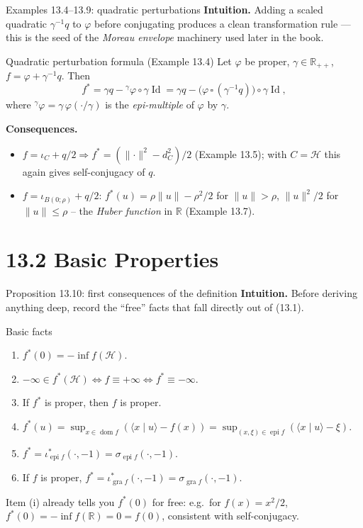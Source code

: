 \documentclass[aspectratio=169,10pt]{beamer}
\newcommand{\R}{\mathbb{R}}
\newcommand{\Hil}{\mathcal{H}}
\newcommand{\inner}[2]{\langle #1 \mid #2 \rangle}
\newcommand{\norm}[1]{\lVert #1 \rVert}
\newcommand{\dom}{\operatorname{dom}}
\newcommand{\epi}{\operatorname{epi}}
\newcommand{\gra}{\operatorname{gra}}
\newcommand{\Id}{\operatorname{Id}}
\newcommand{\iotaC}{\iota_C}
\newcommand{\conj}[1]{#1^{*}}
\begin{document}
\begin{frame}{Examples 13.4--13.9: quadratic perturbations}
  \textbf{Intuition.} Adding a scaled quadratic $\gamma^{-1}q$ to $\varphi$
  before conjugating produces a clean transformation rule --- this is the
  seed of the \emph{Moreau envelope} machinery used later in the book.
  \begin{block}{Quadratic perturbation formula (Example 13.4)}
    Let $\varphi$ be proper, $\gamma\in\R_{++}$, $f=\varphi+\gamma^{-1}q$. Then
    \[
      \conj f = \gamma q - {}^{\gamma}\!\varphi\circ\gamma\Id
              = \gamma q - \big(\varphi\,\square\,(\gamma^{-1}q)\big)\circ\gamma\Id,
      \tag{13.4}
    \]
    where ${}^{\gamma}\varphi = \gamma\,\varphi(\cdot/\gamma)$ is the
    \emph{epi-multiple} of $\varphi$ by $\gamma$.
  \end{block}
  \textbf{Consequences.}
  \begin{itemize}
    \item $f=\iotaC+q/2 \Rightarrow \conj f = (\norm{\cdot}^2-d_C^2)/2$
      (Example 13.5); with $C=\Hil$ this again gives self-conjugacy of $q$.
    \item $f=\iota_{B(0;\rho)}+q/2$: $\conj f(u)=\rho\norm u-\rho^2/2$ for
      $\norm u>\rho$, $\norm u^2/2$ for $\norm u\le\rho$ -- the
      \emph{Huber function} in $\R$ (Example 13.7).
  \end{itemize}
\end{frame}

\section{13.2 Basic Properties}

\begin{frame}{Proposition 13.10: first consequences of the definition}
  \textbf{Intuition.} Before deriving anything deep, record the ``free''
  facts that fall directly out of (13.1).
  \begin{block}{Basic facts}
    \begin{enumerate}
      \item[(i)] $\conj f(0) = -\inf f(\Hil)$.
      \item[(ii)] $-\infty\in \conj f(\Hil) \iff f\equiv+\infty \iff
        \conj f\equiv-\infty$.
      \item[(iii)] If $\conj f$ is proper, then $f$ is proper.
      \item[(iv)] $\conj f(u) = \sup_{x\in\dom f}(\inner xu - f(x))
        = \sup_{(x,\xi)\in\epi f}(\inner xu-\xi)$.
      \item[(v)] $\conj f = \iota^{*}_{\epi f}(\cdot,-1) = \sigma_{\epi f}(\cdot,-1)$.
      \item[(vi)] If $f$ is proper, $\conj f = \iota^{*}_{\gra f}(\cdot,-1)
        = \sigma_{\gra f}(\cdot,-1)$.
    \end{enumerate}
  \end{block}
  Item (i) already tells you $\conj f(0)$ for free: e.g.\ for $f(x)=x^2/2$,
  $\conj f(0)=-\inf f(\R) = 0 = f(0)$, consistent with self-conjugacy.
\end{frame}
\end{document}
